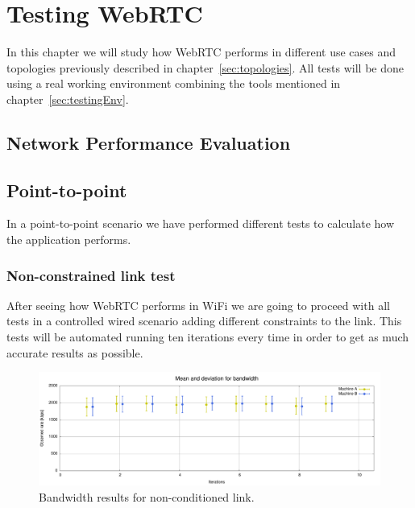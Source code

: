 \section{Testing WebRTC}

\thispagestyle{empty}

In this chapter we will study how WebRTC performs in different use cases and topologies previously described in chapter~\ref{sec:topologies}. All tests will be done using a real working environment combining the tools mentioned in chapter~\ref{sec:testingEnv}.

\subsection{Network Performance Evaluation}

\subsection{Point-to-point}

In a point-to-point scenario we have performed different tests to calculate how the application performs. 

\subsubsection{Non-constrained link test}

After seeing how WebRTC performs in WiFi  we are going to proceed with all tests in a controlled wired scenario adding different constraints to the link. This tests will be automated running ten iterations every time in order to get as much accurate results as possible.
 
 \begin{figure}[h]
  \centering
    \includegraphics[width=1\textwidth]{./figures/no_ipfw.pdf}
      \caption[Bandwidth results for non-conditioned link]{Bandwidth results for non-conditioned link.}
	\label{fig:no_ipfw}
\end{figure}

